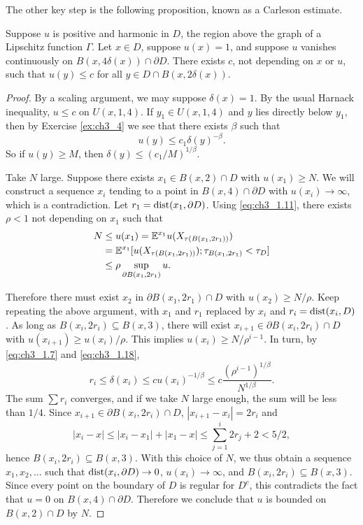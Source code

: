 The other key step is the following proposition, known as a Carleson estimate.

\mpagebreak

\begin{theorem}\label{thm:ch3_1.8}
Suppose $u$ is positive and harmonic in $D$, the region above the graph of a Lipschitz function $\Gamma$. Let $x \in D$, suppose $u(x) = 1$, and suppose $u$ vanishes continuously on $B(x,4\delta(x)) \cap \partial D$. There exists $c$, not depending on $x$ or $u$, such that $u(y) \leq c$ for all $y \in D \cap B(x,2\delta(x))$.
\end{theorem}

\begin{proof}
By a scaling argument, we may suppose $\delta(x) = 1$. By the usual Harnack inequality, $u \leq c$ on $U(x,1,4)$. If $y_1 \in U(x,1,4)$ and $y$ lies directly below $y_1$, then by Exercise \ref{ex:ch3_4} we see that there exists $\beta$ such that
\begin{equation}\label{eq:ch3_1.18}
    u(y) \leq c_1\delta(y)^{-\beta}.
\end{equation}
So if $u(y) \geq M$, then $\delta(y) \leq (c_1/M)^{1/\beta}$.

Take $N$ large. Suppose there exists $x_1 \in B(x,2) \cap D$ with $u(x_1) \geq N$. We will construct a sequence $x_i$ tending to a point in $B(x,4) \cap \partial D$ with $u(x_i) \to \infty$, which is a contradiction. Let $r_1 = \operatorname{dist}(x_1,\partial D)$. Using \eqref{eq:ch3_1.11}, there exists $\rho < 1$ not depending on $x_1$ such that
\begin{align*}
    N &\leq u(x_1) = \mathbb{E}^{x_1}u(X_{\tau(B(x_1,2r_1))}) \\
    &= \mathbb{E}^{x_1}[u(X_{\tau(B(x_1,2r_1))}); \tau_{B(x_1,2r_1)} < \tau_D] \\
    &\leq \rho \sup_{\partial B(x_1,2r_1)} u.
\end{align*}

Therefore there must exist $x_2$ in $\partial B(x_1,2r_1) \cap D$ with $u(x_2) \geq N/\rho$. Keep repeating the above argument, with $x_1$ and $r_1$ replaced by $x_i$ and $r_i = \operatorname{dist}(x_i,D)$. As long as $B(x_i,2r_i) \subseteq B(x,3)$, there will exist $x_{i+1} \in \partial B(x_i,2r_i) \cap D$ with $u(x_{i+1}) \geq u(x_i)/\rho$. This implies $u(x_i) \geq N/\rho^{i-1}$. In turn, by \eqref{eq:ch3_1.7} and \eqref{eq:ch3_1.18},
\[
    r_i \leq \delta(x_i) \leq cu(x_i)^{-1/\beta} \leq c\frac{(\rho^{i-1})^{1/\beta}}{N^{1/\beta}}.
\]
The sum $\sum r_i$ converges, and if we take $N$ large enough, the sum will be less than $1/4$. Since $x_{i+1} \in \partial B(x_i,2r_i) \cap D$, $|x_{i+1} - x_i| = 2r_i$ and
\[
    |x_i - x| \leq |x_i - x_1| + |x_1 - x| \leq \sum_{j=1}^i 2r_j + 2 < 5/2,
\]
hence $B(x_i,2r_i) \subseteq B(x,3)$. With this choice of $N$, we thus obtain a sequence $x_1,x_2,\ldots$ such that $\operatorname{dist}(x_i,\partial D) \to 0$, $u(x_i) \to \infty$, and $B(x_i,2r_i) \subseteq B(x,3)$. Since every point on the boundary of $D$ is regular for $D^c$, this contradicts the fact that $u = 0$ on $B(x,4) \cap \partial D$. Therefore we conclude that $u$ is bounded on $B(x,2) \cap D$ by $N$.
\end{proof}

